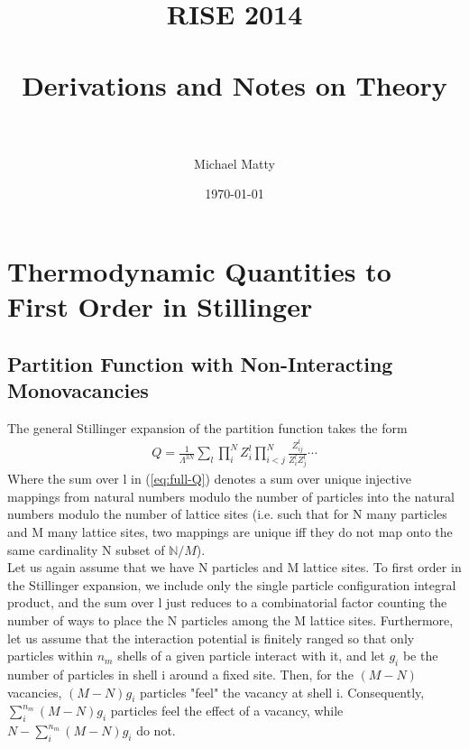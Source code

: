 \documentclass[paper=a4, fontsize=11pt]{scrartcl} %
\title{	
\normalfont \normalsize 
\textsc{RISE 2014} \\ [25pt] %
\horrule{0.5pt} \\[0.4cm] %
\huge Derivations and Notes on Theory \\ %
\horrule{2pt} \\[0.5cm] %
}
\author{Michael Matty} %
\date{\normalsize\today} %
\numberwithin{equation}{section} %
\numberwithin{figure}{section} %
\numberwithin{table}{section} %
\begin{document}
\maketitle %


\section{Thermodynamic Quantities to First Order in Stillinger}


\subsection{Partition Function with Non-Interacting Monovacancies}
The general Stillinger expansion of the partition function takes the form
\begin{align}
  \label{eq:full-Q}
  Q = \frac{1}{\Lambda^{3N}} \sum\limits_l \prod\limits_i^N Z_i^l
      \prod\limits_{i<j}^N \frac{Z_{ij}^l}{Z_i^lZ_j^l} \cdots
\end{align}
Where the sum over l in (\ref{eq:full-Q}) denotes a sum over unique injective
mappings from natural numbers modulo the number of particles into the
natural numbers modulo the number of lattice sites (i.e. such that for
N many particles and M many lattice sites, two mappings are unique iff they do
not map onto the same cardinality N subset of $\mathbb{N}/M$).\\

Let us again assume that we have N particles and M lattice sites. To first
order in the Stillinger expansion, we include only the single particle
configuration integral product, and the sum over l just reduces to a
combinatorial factor counting the number of ways to place the N particles
among the M lattice sites.  Furthermore, let us assume that the interaction
potential is finitely ranged so that only particles within $n_m$ shells of a
given particle interact with it, and let $g_i$ be the number of particles
in shell i around a fixed site.  Then, for the $(M-N)$ vacancies,
$(M-N)g_i$ particles "feel" the vacancy at shell i.  Consequently,
$\sum\limits_i^{n_m} (M-N)g_i$ particles feel the effect of a vacancy,
while $N-\sum\limits_i^{n_m}(M-N)g_i$ do not.\\
\end{document}
